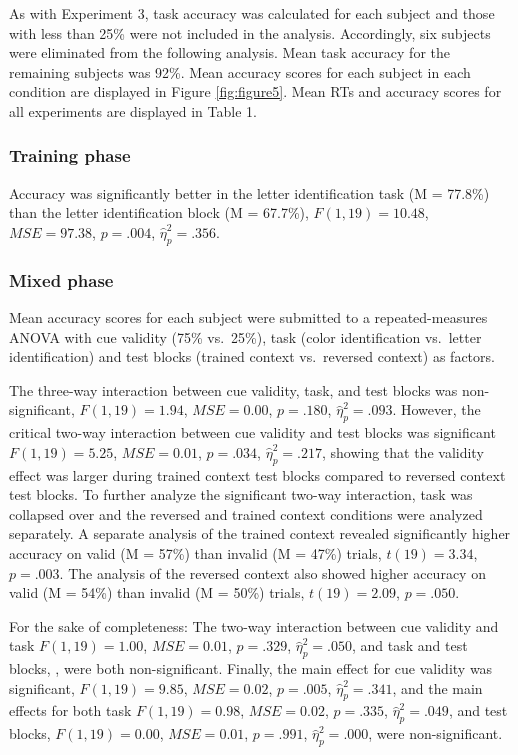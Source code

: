\documentclass[english,,man,floatsintext]{apa6}
\begin{document}
As with Experiment 3, task accuracy was calculated for each subject and
those with less than 25\% were not included in the analysis.
Accordingly, six subjects were eliminated from the following analysis.
Mean task accuracy for the remaining subjects was 92\%. Mean accuracy
scores for each subject in each condition are displayed in Figure
\ref{fig:figure5}. Mean RTs and accuracy scores for all experiments are
displayed in Table 1.

\subsubsection{Training phase}\label{training-phase-1}

Accuracy was significantly better in the letter identification task (M =
77.8\%) than the letter identification block (M = 67.7\%),
\(F(1, 19) = 10.48\), \(\mathit{MSE} = 97.38\), \(p = .004\),
\(\hat{\eta}^2_p = .356\).

\subsubsection{Mixed phase}\label{mixed-phase-1}

Mean accuracy scores for each subject were submitted to a
repeated-measures ANOVA with cue validity (75\% vs.~25\%), task (color
identification vs.~letter identification) and test blocks (trained
context vs.~reversed context) as factors.

The three-way interaction between cue validity, task, and test blocks
was non-significant, \(F(1, 19) = 1.94\), \(\mathit{MSE} = 0.00\),
\(p = .180\), \(\hat{\eta}^2_p = .093\). However, the critical two-way
interaction between cue validity and test blocks was significant
\(F(1, 19) = 5.25\), \(\mathit{MSE} = 0.01\), \(p = .034\),
\(\hat{\eta}^2_p = .217\), showing that the validity effect was larger
during trained context test blocks compared to reversed context test
blocks. To further analyze the significant two-way interaction, task was
collapsed over and the reversed and trained context conditions were
analyzed separately. A separate analysis of the trained context revealed
significantly higher accuracy on valid (M = 57\%) than invalid (M =
47\%) trials, \(t(19) = 3.34\), \(p = .003\). The analysis of the
reversed context also showed higher accuracy on valid (M = 54\%) than
invalid (M = 50\%) trials, \(t(19) = 2.09\), \(p = .050\).

For the sake of completeness: The two-way interaction between cue
validity and task \(F(1, 19) = 1.00\), \(\mathit{MSE} = 0.01\),
\(p = .329\), \(\hat{\eta}^2_p = .050\), and task and test blocks, ,
were both non-significant. Finally, the main effect for cue validity was
significant, \(F(1, 19) = 9.85\), \(\mathit{MSE} = 0.02\), \(p = .005\),
\(\hat{\eta}^2_p = .341\), and the main effects for both task
\(F(1, 19) = 0.98\), \(\mathit{MSE} = 0.02\), \(p = .335\),
\(\hat{\eta}^2_p = .049\), and test blocks, \(F(1, 19) = 0.00\),
\(\mathit{MSE} = 0.01\), \(p = .991\), \(\hat{\eta}^2_p = .000\), were
non-significant.
\end{document}
